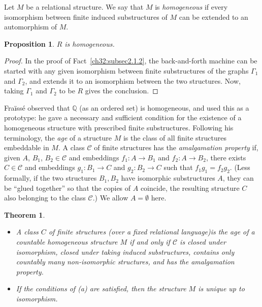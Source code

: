 \documentclass{book}
\newtheorem{theorem}{Theorem}
\newtheorem{proposition}{Proposition}
\begin{document}
Let $M$ be a relational structure. We say that $M$ is
\emph{homogeneous} if every isomorphism between finite induced
substructures of $M$ can be extended to an automorphism of $M$.

\begin{proposition}\label{ch32:prop5.1} 
$R$ is homogeneous.
\end{proposition}
\begin{proof}
In the proof of Fact~\ref{ch32:subsec2.1.2}, the
back-and-forth machine can be started with any given isomorphism
between finite substructures of the graphs $\Gamma_1$ and
$\Gamma_2$, and extends it to an isomorphism between the two
structures. Now, taking $\Gamma_1$ and $\Gamma_2$ to be $R$ gives
the conclusion.
\end{proof}

Fra\"{i}ss\'{e} \cite{ch32:bib21} observed that $\mathbb{Q}$ (as an
ordered set) is homogeneous, and used this as a prototype: he gave a
necessary and sufficient condition for the existence of a
homogeneous structure with prescribed finite substructures.
Following his terminology, the \emph{age} of a structure $M$ is the
class of all finite structures embeddable in $M$. A class
$\mathcal{C}$ of finite structures has the \emph{amalgamation
property} if, given $A$, $B_1$, $B_2 \in \mathcal{C}$ and embeddings
$f_1 : A \rightarrow B_1$ and $f_2 : A \rightarrow B_2$, there
exists $C \in\mathcal{C}$ and embeddings $g_1 : B_1 \rightarrow C$
and $g_2 : B_2 \rightarrow C$ such that $f_1g_1 = f_2g_2$. (Less
formally, if the two structures $B_1, B_2$ have isomorphic
substructures $A$, they can be ``glued together'' so that the copies
of $A$ coincide, the resulting structure $C$ also belonging to the
class $\mathcal{C}$.) We allow $A=\emptyset$ here.

\begin{theorem}\label{ch32:them5.1} 
\begin{itemize}
\item[(a)] A class $C$ of finite structures (over a
fixed relational language)is the age of a countable homogeneous
structure $M$ if and only if $\mathcal{C}$ is closed under
isomorphism, closed under taking induced substructures, contains
only countably many non-isomorphic structures, and has the
amalgamation property.
\item[(b)] If the conditions of (a) are satisfied,
then the structure $M$ is unique up to isomorphism.
\end{itemize}
\end{theorem}
\end{document}
